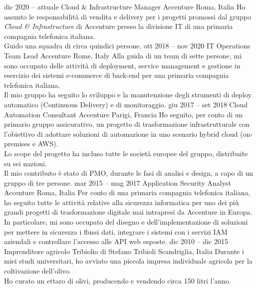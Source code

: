 \documentclass[9pt]{developercv}
\begin{document}
\begin{entrylist}
	\entry
		{dic 2020 -- attuale}
		{Cloud \& Infrastructure Manager}
		{Accenture}
		{Roma, Italia}
		{
			Ho assunto le responsabilità di vendita e delivery per i progetti promossi dal gruppo \textit{Cloud \& Infrastructure} di Accenture presso la divisione IT di una primaria compagnia telefonica italiana.
			\\
			Guido una squadra di circa quindici persone.
		}
	\entry
		{ott 2018 -- nov 2020}
		{IT Operations Team Lead}
		{Accenture}
		{Rome, Italy}
		{
			Alla guida di un team di sette persone, mi sono occupato delle attività di deployment, service management e gestione in esercizio dei sistemi e-commerce di back-end per una primaria compagnia telefonica italiana.
			\\
			Il mio gruppo ha seguito lo sviluppo e la manutenzione degli strumenti di deploy automatico (Continuous Delivery) e di monitoraggio.
		}
	\entry
		{giu 2017 -- set 2018}
		{Cloud Automation Consultant}
		{Accenture}
		{Parigi, Francia}
		{
			Ho seguito, per conto di un primario gruppo assicurativo, un progetto di trasformazione infrastrutturale con l'obiettivo di adottare soluzioni di automazione in uno scenario hybrid cloud (on-premises e AWS).
			\\
			Lo scope del progetto ha incluso tutte le società europee del gruppo, distribuite su sei nazioni.
			\\
			Il mio contributo è stato di PMO, durante le fasi di analisi e design, a capo di un gruppo di tre persone.
		}
	\entry
		{mar 2015 -- mag 2017}
		{Application Security Analyst}
		{Accenture}
		{Roma, Italia}
		{
			Per conto di una primaria compagnia telefonica italiana, ho seguito tutte le attività relative alla sicurezza informatica per uno dei più grandi progetti di trasformazione digitale mai intrapresi da Accenture in Europa.
			\\
			In particolare, mi sono occupato del disegno e dell'implementazione di soluzioni per mettere in sicurezza i flussi dati, integrare i sistemi con i servizi IAM aziendali e controllare l'accesso alle API web esposte.
		}
	\entry
		{dic 2010 -- dic 2015}
		{Imprenditore agricolo}
		{Tribiolio di Stefano Tribioli}
		{Scandriglia, Italia}
		{
			Durante i miei studi universitari, ho avviato una piccola impresa individuale agricola per la coltivazione dell'olivo.
			\\
			Ho curato un ettaro di olivi, producendo e vendendo circa 150 litri l'anno.
		}
\end{entrylist}
\end{document}
